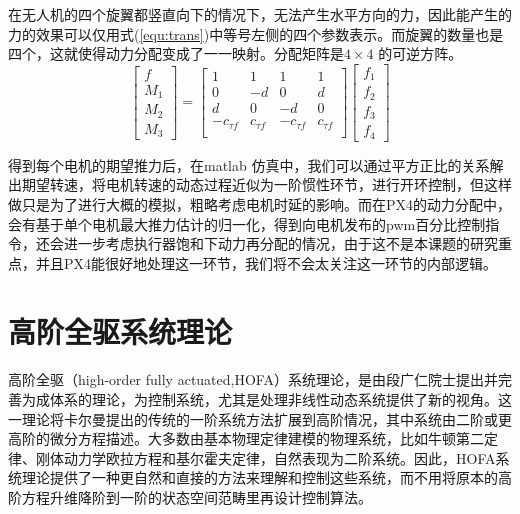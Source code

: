 在无人机的四个旋翼都竖直向下的情况下，无法产生水平方向的力，因此能产生的力的效果可以仅用式(\ref{equ:trans})中等号左侧的四个参数表示。而旋翼的数量也是四个，这就使得动力分配变成了一一映射。分配矩阵是$4\times 4$ 的可逆方阵。
\begin{equation}
  \begin{bmatrix}
    f \\
    M_1 \\
     M_2\\M_3
    \end{bmatrix}=\begin{bmatrix}
    1 &1  & 1 & 1 \\
    0 & -d & 0 & d \\
    d & 0 & -d & 0 \\
    -c_{\tau f} & c_{\tau f} & -c_{\tau f} & c_{\tau f} \\
    \end{bmatrix}\begin{bmatrix}
     f_1\\
    f_2 \\
     f_3\\f_4
    \end{bmatrix}   
    \label{equ:trans}
\end{equation}

得到每个电机的期望推力后，在matlab 仿真中，我们可以通过平方正比的关系解出期望转速，将电机转速的动态过程近似为一阶惯性环节，进行开环控制，但这样做只是为了进行大概的模拟，粗略考虑电机时延的影响。而在PX4的动力分配中，会有基于单个电机最大推力估计的归一化，得到向电机发布的pwm百分比控制指令，还会进一步考虑执行器饱和下动力再分配的情况，由于这不是本课题的研究重点，并且PX4能很好地处理这一环节，我们将不会太关注这一环节的内部逻辑。



\section{高阶全驱系统理论}

高阶全驱（high-order fully actuated,HOFA）系统理论\cite{段1}\cite{段2}，是由段广仁院士提出并完善为成体系的理论，为控制系统，尤其是处理非线性动态系统提供了新的视角。这一理论将卡尔曼提出的传统的一阶系统方法扩展到高阶情况，其中系统由二阶或更高阶的微分方程描述。大多数由基本物理定律建模的物理系统，比如牛顿第二定律、刚体动力学欧拉方程和基尔霍夫定律，自然表现为二阶系统。因此，HOFA系统理论提供了一种更自然和直接的方法来理解和控制这些系统，而不用将原本的高阶方程升维降阶到一阶的状态空间范畴里再设计控制算法。

